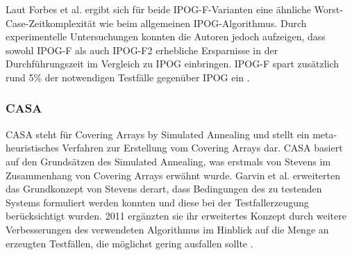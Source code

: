 Laut Forbes et al. \cite{forbes2008refining} ergibt sich für beide IPOG-F-Varianten eine ähnliche Worst-Case-Zeitkomplexität wie beim allgemeinen IPOG-Algorithmus. Durch experimentelle Untersuchungen konnten die Autoren jedoch aufzeigen, dass sowohl IPOG-F als auch IPOG-F2 erhebliche Ersparnisse in der Durchführungszeit im Vergleich zu IPOG einbringen. IPOG-F spart zusätzlich rund 5\% der notwendigen Testfälle gegenüber IPOG ein \cite{forbes2008refining}.



\subsubsection{CASA}\label{subsub:casa}

CASA \cite{garvin2009improved, garvin2011evaluating} steht für \glqq Covering Arrays by Simulated Annealing\grqq{} und stellt ein meta-heuristisches Verfahren zur Erstellung vom Covering Arrays dar. CASA basiert auf den Grundsätzen des Simulated Annealing, was erstmals von Stevens \cite{stevens1999transversal} im Zusammenhang von Covering Arrays erwähnt wurde. Garvin et al. \cite{garvin2009improved} erweiterten das Grundkonzept von Stevens derart, dass Bedingungen des zu testenden Systems formuliert werden konnten und diese bei der Testfallerzeugung berücksichtigt wurden. 2011 ergänzten sie ihr erweitertes Konzept durch weitere Verbesserungen des verwendeten Algorithmus im Hinblick auf die Menge an erzeugten Testfällen, die möglichst gering ausfallen sollte \cite{garvin2011evaluating}.

